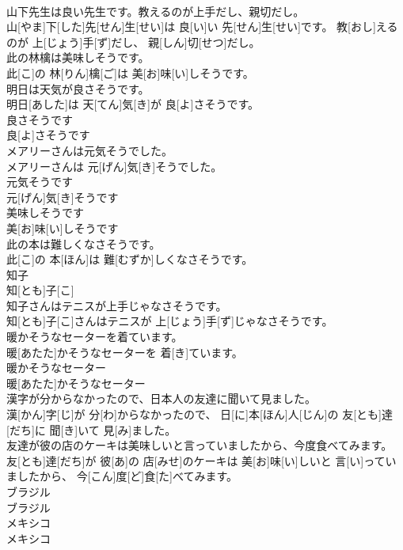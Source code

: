 \documentclass[8pt]{extreport}
\begin{document}
\begin{CJK}{UTF8}{min}
\\	山下先生は良い先生です。教えるのが上手だし、親切だし。	
\\	山[やま]下[した]先[せん]生[せい]は 良[い]い 先[せん]生[せい]です。 教[おし]えるのが 上[じょう]手[ず]だし、 親[しん]切[せつ]だし。
\\	此の林檎は美味しそうです。	
\\	此[こ]の 林[りん]檎[ご]は 美[お]味[い]しそうです。
\\	明日は天気が良さそうです。	
\\	明日[あした]は 天[てん]気[き]が 良[よ]さそうです。
\\	良さそうです	
\\	良[よ]さそうです
\\	メアリーさんは元気そうでした。	
\\	メアリーさんは 元[げん]気[き]そうでした。
\\	元気そうです	
\\	元[げん]気[き]そうです
\\	美味しそうです	
\\	美[お]味[い]しそうです
\\	此の本は難しくなさそうです。	
\\	此[こ]の 本[ほん]は 難[むずか]しくなさそうです。
\\	知子	
\\	知[とも]子[こ]	
\\	知子さんはテニスが上手じゃなさそうです。	
\\	知[とも]子[こ]さんはテニスが 上[じょう]手[ず]じゃなさそうです。
\\	暖かそうなセーターを着ています。	
\\	暖[あたた]かそうなセーターを 着[き]ています。
\\	暖かそうなセーター	
\\	暖[あたた]かそうなセーター
\\	漢字が分からなかったので、日本人の友達に聞いて見ました。	
\\	漢[かん]字[じ]が 分[わ]からなかったので、 日[に]本[ほん]人[じん]の 友[とも]達[だち]に 聞[き]いて 見[み]ました。
\\	友達が彼の店のケーキは美味しいと言っていましたから、今度食べてみます。	
\\	友[とも]達[だち]が 彼[あ]の 店[みせ]のケーキは 美[お]味[い]しいと 言[い]っていましたから、 今[こん]度[ど]食[た]べてみます。
\\	ブラジル	
\\	ブラジル	
\\	メキシコ	
\\	メキシコ

\end{CJK}
\end{document}
